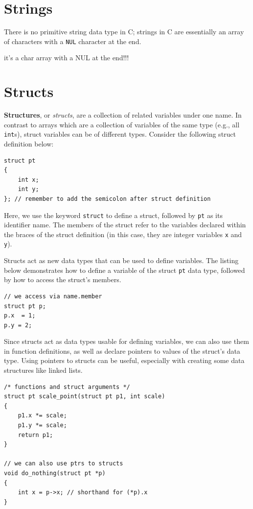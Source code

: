 \section{Strings}

There is no primitive string data type in C; strings in C are essentially an array of characters with a \verb|NUL| character at the end.

it's a char array with a NUL at the end!!!


\section{Structs}

\textbf{Structures}, or \textit{structs}, are a collection of related variables under one name.
In contrast to arrays which are a collection of variables of the same type (e.g., all \verb|int|s), struct variables can be of different types.
Consider the following struct definition below:

\begin{verbatim}
struct pt
{
    int x;
    int y;
}; // remember to add the semicolon after struct definition
\end{verbatim}

Here, we use the keyword \verb|struct| to define a struct, followed by \verb|pt| as its identifier name.
The members of the struct refer to the variables declared within the braces of the struct definition (in this case, they are integer variables \verb|x| and \verb|y|).

Structs act as new data types that can be used to define variables.
The listing below demonstrates how to define a variable of the struct \verb|pt| data type, followed by how to access the struct's members.

\begin{verbatim}
// we access via name.member
struct pt p;
p.x  = 1;
p.y = 2;
\end{verbatim}

Since structs act as data types usable for defining variables, we can also use them in function definitions, as well as declare pointers to values of the struct's data type.
Using pointers to structs can be useful, especially with creating some data structures like linked lists.

\begin{verbatim}
/* functions and struct arguments */
struct pt scale_point(struct pt p1, int scale)
{
    p1.x *= scale;
    p1.y *= scale;
    return p1;
}

// we can also use ptrs to structs
void do_nothing(struct pt *p)
{
    int x = p->x; // shorthand for (*p).x
}
\end{verbatim}


